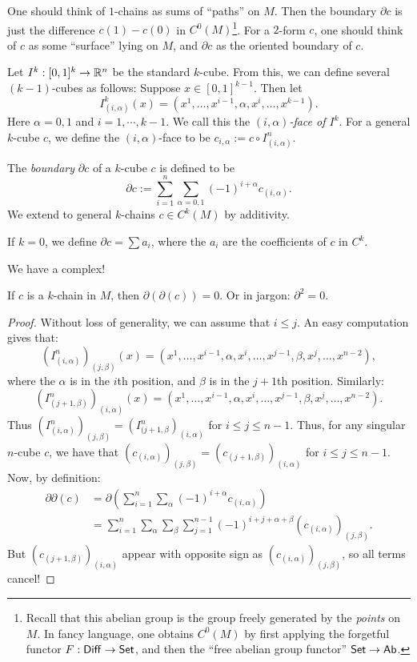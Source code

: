 \documentclass[11pt, english]{article}
\begin{document}
One should think of $1$-chains as sums of ``paths'' on $M$. Then the boundary $\partial c$ is just the difference $c(1)-c(0)$ in $C^0(M)$\footnote{Recall that this abelian group is the group freely generated by the \emph{points} on $M$. In fancy language, one obtains $C^0(M)$ by first applying the forgetful functor $F:\mathsf{Diff} \to \mathsf{Set}$, and then the ``free abelian group functor'' $\mathsf{Set} \to \mathsf{Ab}$.}. For a $2$-form $c$, one should think of $c$ as some ``surface'' lying on $M$, and $\partial c$ as the oriented boundary of $c$.

Let $I^k:[0,1]^k \to \mathbb{R}^n$ be the standard $k$-cube. From this, we can define several $(k-1)$-cubes as follows: Suppose $x \in [0,1]^{k-1}$. Then let
\[
I^k_{(i,\alpha)}(x) = (x^1,\ldots, x^{i-1},\alpha, x^i,\ldots, x^{k-1}).
\]
Here $\alpha=0,1$ and $i=1,\cdots,k-1$. We call this the \emph{$(i,\alpha)$-face of $I^k$}. For a general $k$-cube $c$, we define the $(i,\alpha)$-face to be $c_{i,\alpha} := c \circ I^n_{(i,\alpha)}$.

\begin{defi}
  The \emph{boundary} $\partial c$ of a $k$-cube $c$ is defined to be 
\[
\partial c  := \sum_{i=1}^n \sum_{\alpha = 0,1} (-1)^{i+\alpha} c_{(i,\alpha)}.
\]
We extend to general $k$-chains $c \in C^k(M)$ by additivity.

If $k=0$, we define $\partial c = \sum a_i$, where the $a_i$ are the coefficients of $c$ in $C^k$.
\end{defi}

We have a complex!

\begin{prop}
 If $c$ is a $k$-chain in $M$, then $\partial(\partial (c)) = 0$. Or in jargon: $\partial^2=0$.
\end{prop}
\begin{proof}
Without loss of generality, we can assume that $i \leq j$. An easy computation gives that:
\[
(I^n_{(i,\alpha)})_{(j,\beta)}(x)=\left(x^1,\ldots,x^{i-1},\alpha,x^i,\ldots,x^{j-1},\beta,x^j,\ldots,x^{n-2}\right),
\]
where the $\alpha$ is in the $i$th position, and $\beta$ is in the $j+1$th position. Similarly:
\[
(I^n_{(j+1,\beta)})_{(i,\alpha)}(x)=\left(x^1,\ldots,x^{i-1},\alpha,x^i,\ldots,x^{j-1},\beta,x^j,\ldots,x^{n-2}\right).
\]
Thus $(I_{(i,\alpha)}^n)_{(j,\beta)}=(I_{(j+1,\beta}^n)_{(i,\alpha)}$ for $i \leq j \leq n-1$. Thus, for any singular $n$-cube $c$, we have that $(c_{(i,\alpha)})_{(j,\beta)}=(c_{(j+1,\beta)})_{(i,\alpha)}$ for $i\leq j\leq n-1$. Now, by definition:
\begin{align*}
\partial \partial(c) &= \partial(\sum_{i=1}^n \sum_{\alpha} (-1)^{i+\alpha} c_{(i,\alpha)}) \\
&= \sum_{i=1}^n \sum_{\alpha} \sum_\beta \sum_{j=1}^{n-1} (-1)^{i+j+\alpha+\beta}(c_{(i,\alpha)})_{(j,\beta)}.  
\end{align*}
But $(c_{(j+1,\beta)})_{(i,\alpha)}$ appear with opposite sign as $(c_{(i,\alpha)})_{(j,\beta)}$, so all terms cancel!
\end{proof}
\end{document}
